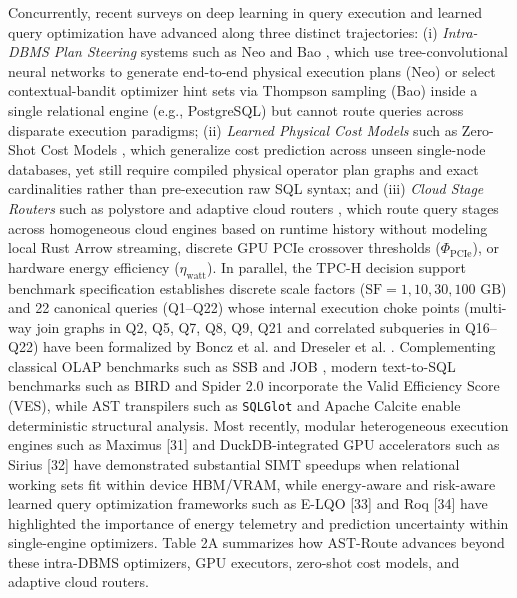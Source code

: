 \documentclass[10pt,a4paper]{article}
\begin{document}
Concurrently, recent surveys on deep learning in query execution \cite{milicevic2024dlquery} and learned query optimization have advanced along three distinct trajectories: (i) \emph{Intra-DBMS Plan Steering} systems such as Neo \cite{marcus2019neo} and Bao \cite{marcus2021bao}, which use tree-convolutional neural networks to generate end-to-end physical execution plans (Neo) or select contextual-bandit optimizer hint sets via Thompson sampling (Bao) inside a single relational engine (e.g., PostgreSQL) but cannot route queries across disparate execution paradigms; (ii) \emph{Learned Physical Cost Models} such as Zero-Shot Cost Models \cite{hilprecht2022zeroshot}, which generalize cost prediction across unseen single-node databases, yet still require compiled physical operator plan graphs and exact cardinalities rather than pre-execution raw SQL syntax; and (iii) \emph{Cloud Stage Routers} such as polystore and adaptive cloud routers \cite{tan2023stage}, which route query stages across homogeneous cloud engines based on runtime history without modeling local Rust Arrow streaming, discrete GPU PCIe crossover thresholds ($\Phi_{\text{PCIe}}$), or hardware energy efficiency ($\eta_{\text{watt}}$). In parallel, the TPC-H decision support benchmark specification \cite{tpc2022tpch} establishes discrete scale factors ($\text{SF}=1, 10, 30, 100\text{ GB}$) and 22 canonical queries (Q1--Q22) whose internal execution choke points (multi-way join graphs in Q2, Q5, Q7, Q8, Q9, Q21 and correlated subqueries in Q16--Q22) have been formalized by Boncz et al. \cite{boncz2014tpch} and Dreseler et al. \cite{dreseler2020quantifying}. Complementing classical OLAP benchmarks such as SSB \cite{oneil2009ssb} and JOB \cite{leis2015job}, modern text-to-SQL benchmarks such as BIRD \cite{li2023bird} and Spider 2.0 \cite{lei2025spider2} incorporate the Valid Efficiency Score (VES), while AST transpilers such as \texttt{SQLGlot} \cite{mao2024sqlglot} and Apache Calcite \cite{begoli2018calcite} enable deterministic structural analysis. Most recently, modular heterogeneous execution engines such as Maximus [31] and DuckDB-integrated GPU accelerators such as Sirius [32] have demonstrated substantial SIMT speedups when relational working sets fit within device HBM/VRAM, while energy-aware and risk-aware learned query optimization frameworks such as E-LQO [33] and Roq [34] have highlighted the importance of energy telemetry and prediction uncertainty within single-engine optimizers. Table 2A summarizes how AST-Route advances beyond these intra-DBMS optimizers, GPU executors, zero-shot cost models, and adaptive cloud routers.
\end{document}

